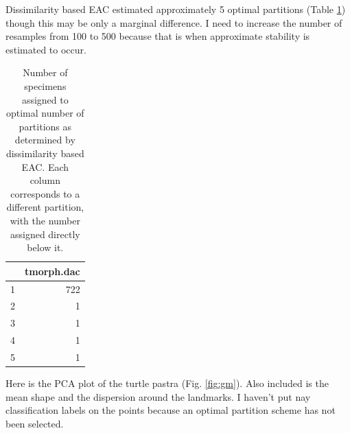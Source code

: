 \documentclass{article}\usepackage{graphicx, color}
\begin{document}
Dissimilarity based EAC estimated approximately 5 optimal partitions (Table \ref{tab:dac}) though this may be only a marginal difference. I need to increase the number of resamples from 100 to 500 because that is when approximate stability is estimated to occur. 

\begin{table}[ht]
\begin{center}
\begin{tabular}{rr}
  \hline
 & tmorph.dac \\ 
  \hline
1 & 722 \\ 
  2 &   1 \\ 
  3 &   1 \\ 
  4 &   1 \\ 
  5 &   1 \\ 
   \hline
\end{tabular}
\caption{Number of specimens assigned to optimal number of partitions as determined by dissimilarity based EAC. Each column corresponds to a different partition, with the number assigned directly below it.}
\label{tab:dac}
\end{center}
\end{table}



Here is the PCA plot of the turtle pastra (Fig. \ref{fig:gm}). Also included is the mean shape and the dispersion around the landmarks. I haven't put nay classification labels on the points because an optimal partition scheme has not been selected.
\end{document}

